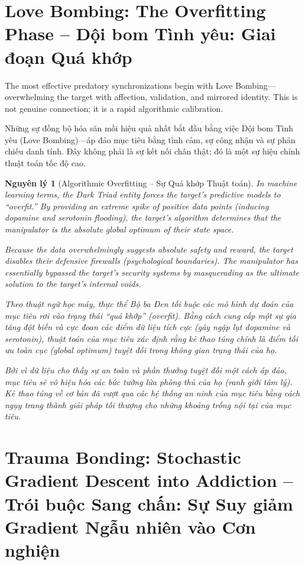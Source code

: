 \documentclass{report}
\newtheorem{nguyenly}{Nguyên lý}
\begin{document}
\section{Love Bombing: The Overfitting Phase -- Dội bom Tình yêu: Giai đoạn Quá khớp}

The most effective predatory synchronizations begin with Love Bombing—overwhelming the target with affection, validation, and mirrored identity. This is not genuine connection; it is a rapid algorithmic calibration.

Những sự đồng bộ hóa săn mồi hiệu quả nhất bắt đầu bằng việc Dội bom Tình yêu (Love Bombing)—áp đảo mục tiêu bằng tình cảm, sự công nhận và sự phản chiếu danh tính. Đây không phải là sự kết nối chân thật; đó là một sự hiệu chỉnh thuật toán tốc độ cao.

\begin{nguyenly}[Algorithmic Overfitting -- Sự Quá khớp Thuật toán]
	In machine learning terms, the Dark Triad entity forces the target's predictive models to ``overfit.'' By providing an extreme spike of positive data points (inducing dopamine and serotonin flooding), the target's algorithm determines that the manipulator is the absolute global optimum of their state space. 
	
	Because the data overwhelmingly suggests absolute safety and reward, the target disables their defensive firewalls (psychological boundaries). The manipulator has essentially bypassed the target's security systems by masquerading as the ultimate solution to the target's internal voids.
	
	Theo thuật ngữ học máy, thực thể Bộ ba Đen tối buộc các mô hình dự đoán của mục tiêu rơi vào trạng thái ``quá khớp'' (overfit). Bằng cách cung cấp một sự gia tăng đột biến và cực đoan các điểm dữ liệu tích cực (gây ngập lụt dopamine và serotonin), thuật toán của mục tiêu xác định rằng kẻ thao túng chính là điểm tối ưu toàn cục (global optimum) tuyệt đối trong không gian trạng thái của họ.
	
	Bởi vì dữ liệu cho thấy sự an toàn và phần thưởng tuyệt đối một cách áp đảo, mục tiêu sẽ vô hiệu hóa các bức tường lửa phòng thủ của họ (ranh giới tâm lý). Kẻ thao túng về cơ bản đã vượt qua các hệ thống an ninh của mục tiêu bằng cách ngụy trang thành giải pháp tối thượng cho những khoảng trống nội tại của mục tiêu.
\end{nguyenly}

\section{Trauma Bonding: Stochastic Gradient Descent into Addiction -- Trói buộc Sang chấn: Sự Suy giảm Gradient Ngẫu nhiên vào Cơn nghiện}
\end{document}

